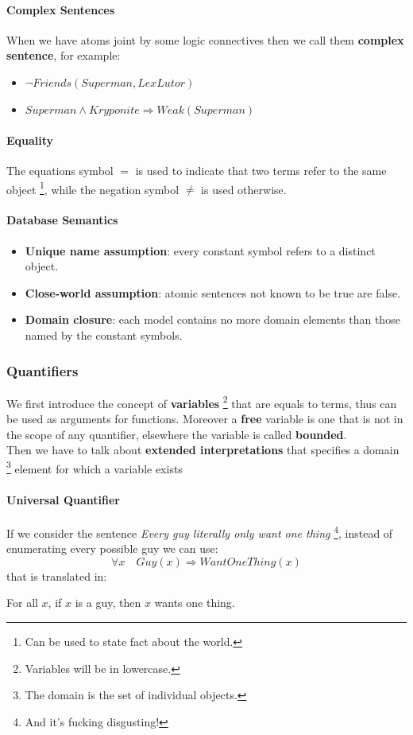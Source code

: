 \documentclass[10pt,a4paper]{article}
\begin{document}
\paragraph{Complex Sentences}
When we have atoms joint by some logic connectives then we call them \textbf{complex sentence}, for example:
\begin{itemize}
\item $\neg Friends(Superman,LexLutor)$
\item $Superman\wedge Kryponite \Rightarrow Weak(Superman)$
\end{itemize}


\paragraph{Equality}
The equations symbol $=$ is used to indicate that two terms refer to the same object \footnote{Can be used to state fact about the world.}, while the negation symbol $\neq$  is used otherwise.


\paragraph{Database Semantics}
\begin{itemize}
\item \textbf{Unique name assumption}: every constant symbol refers to a distinct object.
\item \textbf{Close-world assumption}: atomic sentences not known to be true are false.
\item \textbf{Domain closure}: each model contains no more domain elements than those named by the constant symbols.
\end{itemize}

\subsubsection{Quantifiers}

We first introduce the concept of \textbf{variables} \footnote{Variables will be in lowercase.} that are equals to terms, thus can be used as arguments for functions.
Moreover a \textbf{free} variable is one that is not in the scope of any quantifier, elsewhere the variable is called \textbf{bounded}.\\ 
Then we have to talk about \textbf{extended interpretations} that specifies a domain \footnote{The domain is the set of individual objects.} element for which a variable exists

\paragraph{Universal Quantifier}
If we consider the sentence \textit{Every guy literally only want one thing} \footnote{And it's fucking disgusting!}, instead of enumerating every possible guy we can use:
\[\forall x\quad Guy(x)\Rightarrow WantOneThing(x)\]
that is translated in:\\
\begin{center}
For all $x$, if $x$ is a guy, then $x$ wants one thing.

\end{center}
\end{document}
